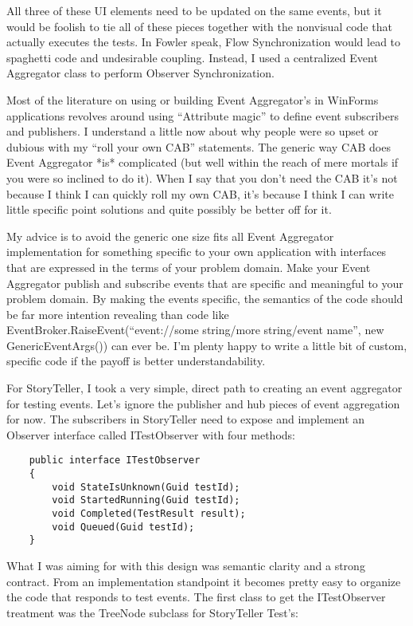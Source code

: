\documentclass{article}
\begin{document}
{All three of these UI elements need to be updated on the same events, but it would be foolish to tie all of these pieces together with the nonvisual code that actually executes the tests.  In Fowler speak, Flow Synchronization would lead to spaghetti code and undesirable coupling.  Instead, I used a centralized Event Aggregator class to perform Observer Synchronization.

Most of the literature on using or building Event Aggregator's in WinForms applications revolves around using “Attribute magic” to define event subscribers and publishers.  I understand a little now about why people were so upset or dubious with my “roll your own CAB” statements.  The generic way CAB does Event Aggregator *is* complicated (but well within the reach of mere mortals if you were so inclined to do it).  When I say that you don't need the CAB it's not because I think I can quickly roll my own CAB, it's because I think I can write little specific point solutions and quite possibly be better off for it.

My advice is to avoid the generic one size fits all Event Aggregator implementation for something specific to your own application with interfaces that are expressed in the terms of your problem domain.  Make your Event Aggregator publish and subscribe events that are specific and meaningful to your problem domain.  By making the events specific, the semantics of the code should be far more intention revealing than code like EventBroker.RaiseEvent(“event://some string/more string/event name”, new GenericEventArgs()) can ever be.  I'm plenty happy to write a little bit of custom, specific code if the payoff is better understandability. 

For StoryTeller, I took a very simple, direct path to creating an event aggregator for testing events.  Let's ignore the publisher and hub pieces of event aggregation for now.  The subscribers in StoryTeller need to expose and implement an Observer interface called ITestObserver with four methods:
\begin{lstlisting}
    public interface ITestObserver
    {
        void StateIsUnknown(Guid testId);
        void StartedRunning(Guid testId);
        void Completed(TestResult result);
        void Queued(Guid testId);
    }
\end{lstlisting}	

What I was aiming for with this design was semantic clarity and a strong contract.  From an implementation standpoint it becomes pretty easy to organize the code that responds to test events.  The first class to get the ITestObserver treatment was the TreeNode subclass for StoryTeller Test's:

}
\end{document}
